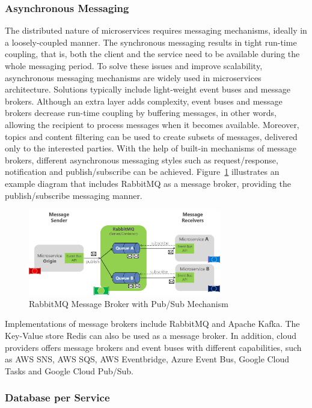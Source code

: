 \documentclass{Configuration_Files/PoliMi3i_thesis}
\begin{document}
\subsubsection{Asynchronous Messaging}
\label{subsubsec:async_msg}

The distributed nature of microservices requires messaging mechanisms, ideally in a loosely-coupled manner.
The synchronous messaging results in tight run-time coupling, that is, both the client and the service need to be available during the whole messaging period.
To solve these issues and improve scalability, asynchronous messaging mechanisms are widely used in microservices architecture.
Solutions typically include light-weight event buses and message brokers.
Although an extra layer adds complexity, event buses and message brokers decrease run-time coupling by buffering messages, in other words, allowing the recipient to process messages when it becomes available.
Moreover, topics and content filtering can be used to create subsets of messages, delivered only to the interested parties.
With the help of built-in mechanisms of message brokers, different asynchronous messaging styles such as request/response, notification and publish/subscribe can be achieved.
Figure~\ref{fig:rabbitmq} illustrates an example diagram that includes RabbitMQ as a message broker, providing the publish/subscribe messaging manner.

\begin{figure}[H]
    \centering
    \includegraphics[width=0.75\textwidth]{myImages/rabbitmq.png}
    \caption{RabbitMQ Message Broker with Pub/Sub Mechanism}
    \label{fig:rabbitmq}
\end{figure}

Implementations of message brokers include RabbitMQ and Apache Kafka.
The Key-Value store Redis can also be used as a message broker.
In addition, cloud providers offers message brokers and event buses with different capabilities, such as AWS SNS, AWS SQS, AWS Eventbridge, Azure Event Bus, Google Cloud Tasks and Google Cloud Pub/Sub.

\subsubsection{Database per Service}
\label{subsubsec:dps}
\end{document}
